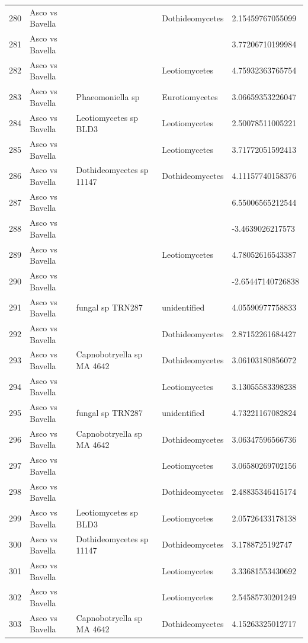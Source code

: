 \documentclass[12pt]{article}\usepackage[]{graphicx}\usepackage[]{color}
\numberwithin{figure}{section}
\begin{document}
\begin{table}[ht]
\begin{tabular}{lllll}
  280 & Asco vs Bavella &  & Dothideomycetes & 2.15459767055099 \\ 
  281 & Asco vs Bavella &  &  & 3.77206710199984 \\ 
  282 & Asco vs Bavella &  & Leotiomycetes & 4.75932363765754 \\ 
  283 & Asco vs Bavella & Phaeomoniella sp & Eurotiomycetes & 3.06659353226047 \\ 
  284 & Asco vs Bavella & Leotiomycetes sp BLD3 & Leotiomycetes & 2.50078511005221 \\ 
  285 & Asco vs Bavella &  & Leotiomycetes & 3.71772051592413 \\ 
  286 & Asco vs Bavella & Dothideomycetes sp 11147 & Dothideomycetes & 4.11157740158376 \\ 
  287 & Asco vs Bavella &  &  & 6.55006565212544 \\ 
  288 & Asco vs Bavella &  &  & -3.4639026217573 \\ 
  289 & Asco vs Bavella &  & Leotiomycetes & 4.78052616543387 \\ 
  290 & Asco vs Bavella &  &  & -2.65447140726838 \\ 
  291 & Asco vs Bavella & fungal sp TRN287 & unidentified & 4.05590977758833 \\ 
  292 & Asco vs Bavella &  & Dothideomycetes & 2.87152261684427 \\ 
  293 & Asco vs Bavella & Capnobotryella sp MA 4642 & Dothideomycetes & 3.06103180856072 \\ 
  294 & Asco vs Bavella &  & Leotiomycetes & 3.13055583398238 \\ 
  295 & Asco vs Bavella & fungal sp TRN287 & unidentified & 4.73221167082824 \\ 
  296 & Asco vs Bavella & Capnobotryella sp MA 4642 & Dothideomycetes & 3.06347596566736 \\ 
  297 & Asco vs Bavella &  & Leotiomycetes & 3.06580269702156 \\ 
  298 & Asco vs Bavella &  & Dothideomycetes & 2.48835346415174 \\ 
  299 & Asco vs Bavella & Leotiomycetes sp BLD3 & Leotiomycetes & 2.05726433178138 \\ 
  300 & Asco vs Bavella & Dothideomycetes sp 11147 & Dothideomycetes & 3.1788725192747 \\ 
  301 & Asco vs Bavella &  & Leotiomycetes & 3.33681553430692 \\ 
  302 & Asco vs Bavella &  & Leotiomycetes & 2.54585730201249 \\ 
  303 & Asco vs Bavella & Capnobotryella sp MA 4642 & Dothideomycetes & 4.15263325012717 \\ 

\end{tabular}
\end{table}
\end{document}
